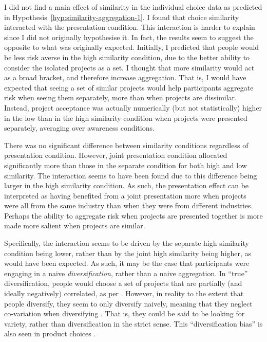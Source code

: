 \documentclass[a4paper, nobind, dvipsnames]{templates/ociamthesis}
\theoremstyle{definition}
\theoremstyle{definition}
\theoremstyle{definition}
\theoremstyle{definition}
\theoremstyle{remark}
\begin{document}
I did not find a main effect of similarity in the individual choice data as
predicted in Hypothesis~\ref{hyp:similarity-aggregation-1}. I found that
choice similarity interacted with the presentation condition. This interaction
is harder to explain since I did not originally hypothesise it. In fact, the
results seem to suggest the opposite to what was originally expected. Initially,
I predicted that people would be less risk averse in the high similarity
condition, due to the better ability to consider the isolated projects as a set.
I thought that more similarity would act as a broad bracket, and therefore
increase aggregation. That is, I would have expected that seeing a set of
similar projects would help participants aggregate risk when seeing them
separately, more than when projects are dissimilar. Instead, project acceptance
was actually numerically (but not statistically) higher in the low than in the
high similarity condition when projects were presented separately, averaging
over awareness conditions.

There was no significant difference between similarity conditions regardless of
presentation condition. However, joint presentation condition allocated
significantly more than those in the separate condition for both high and low
similarity. The interaction seems to have been found due to this difference
being larger in the high similarity condition. As such, the presentation effect
can be interpreted as having benefited from a joint presentation more when
projects were all from the same industry than when they were from different
industries. Perhaps the ability to aggregate risk when projects are presented
together is more made more salient when projects are similar.

Specifically, the interaction seems to be driven by the separate high similarity
condition being lower, rather than by the joint high similarity being higher, as
would have been expected. As such, it may be the case that participants were
engaging in a naive \emph{diversification}, rather than a naive aggregation. In
``true'' diversification, people would choose a set of projects that are partially
(and ideally negatively) correlated, as per \textcite{markowitz1952}. However, in reality
to the extent that people diversify, they seem to only diversify naively,
meaning that they neglect co-variation when diversifying \autocite[e.g.,][]{hedesstrom2006}. That is, they could be said to be looking for variety, rather
than diversification in the strict sense. This ``diversification bias'' is also
seen in product choices \autocite{read1995}.
\end{document}
